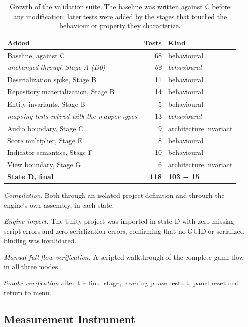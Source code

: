 \documentclass{sbc2019}%
\begin{document}
\begin{table}[!htbp]
\centering
\caption{Growth of the validation suite. The baseline was written against C
before any modification; later tests were added by the stages that touched the
behaviour or property they characterize.}\label{tab:suite}
\small
\begin{tabular}{@{}p{}r p{}@{}}
\toprule
\textbf{Added} & \textbf{Tests} & \textbf{Kind} \\
\midrule
Baseline, against C            & 68  & behavioural \\
\quad \emph{unchanged through Stage A (D0)} & \emph{68} & \emph{behavioural} \\
\addlinespace
Deserialization spike, Stage B & 11  & behavioural \\
Repository materialization, Stage B & 14 & behavioural \\
Entity invariants, Stage B     & 5   & behavioural \\
\quad \emph{mapping tests retired with the mapper types} & \emph{$-13$} & \emph{behavioural} \\
Audio boundary, Stage C        & 9   & architecture invariant \\
Score multiplier, Stage E      & 8   & behavioural \\
Indicator semantics, Stage F   & 10  & behavioural \\
View boundary, Stage G         & 6   & architecture invariant \\
\midrule
\textbf{State D, final}        & \textbf{118} & \textbf{103 + 15} \\
\bottomrule
\end{tabular}
\end{table}

\emph{Compilation.} Both through an isolated project definition and through the
engine's own assembly, in each state.

\emph{Engine import.} The Unity project was imported in state D with zero
missing-script errors and zero serialization errors, confirming that no GUID or
serialized binding was invalidated.

\emph{Manual full-flow verification.} A scripted walkthrough of the complete
game flow in all three modes.

\emph{Smoke verification} after the final stage, covering phase restart, panel
reset and return to menu.

\subsection{Measurement Instrument}
\end{document}
